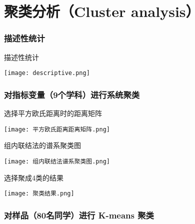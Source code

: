 

\part{聚类分析（Cluster analysis）}

\section{描述性统计}

\begin{frame}{描述性统计}
    \begin{center}
        \texttt{[image: descriptive.png]}
    \end{center}
    \vspace{-0.5cm}
\end{frame}

\section{对指标变量（9个学科）进行系统聚类}

\begin{frame}{选择平方欧氏距离时的距离矩阵}
    \begin{center}
        \texttt{[image: 平方欧氏距离距离矩阵.png]}
    \end{center}
    \vspace{-0.5cm}
\end{frame}

\begin{frame}{组内联结法的谱系聚类图}
    \begin{center}
        \texttt{[image: 组内联结法谱系聚类图.png]}
    \end{center}
    \vspace{-0.5cm}
\end{frame}


\begin{frame}{选择聚成4类的结果}
    \begin{center}
        \texttt{[image: 聚类结果.png]}
    \end{center}
    \vspace{-0.5cm}
\end{frame}


\section{对样品（80名同学）进行 K-means 聚类}

